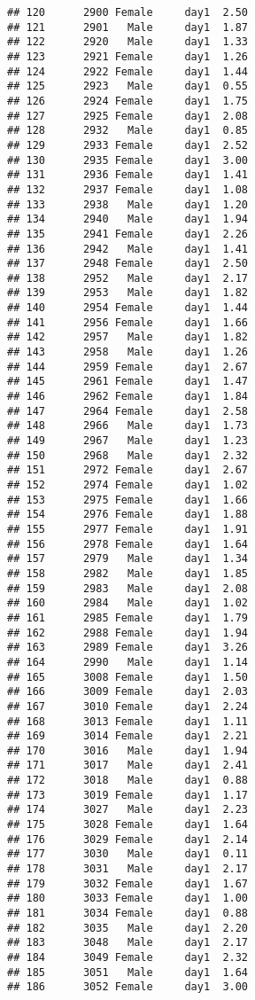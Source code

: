 \documentclass[
]{article}
\begin{document}
\begin{verbatim}
## 120      2900 Female     day1  2.50
## 121      2901   Male     day1  1.87
## 122      2920   Male     day1  1.33
## 123      2921 Female     day1  1.26
## 124      2922 Female     day1  1.44
## 125      2923   Male     day1  0.55
## 126      2924 Female     day1  1.75
## 127      2925 Female     day1  2.08
## 128      2932   Male     day1  0.85
## 129      2933 Female     day1  2.52
## 130      2935 Female     day1  3.00
## 131      2936 Female     day1  1.41
## 132      2937 Female     day1  1.08
## 133      2938   Male     day1  1.20
## 134      2940   Male     day1  1.94
## 135      2941 Female     day1  2.26
## 136      2942   Male     day1  1.41
## 137      2948 Female     day1  2.50
## 138      2952   Male     day1  2.17
## 139      2953   Male     day1  1.82
## 140      2954 Female     day1  1.44
## 141      2956 Female     day1  1.66
## 142      2957   Male     day1  1.82
## 143      2958   Male     day1  1.26
## 144      2959 Female     day1  2.67
## 145      2961 Female     day1  1.47
## 146      2962 Female     day1  1.84
## 147      2964 Female     day1  2.58
## 148      2966   Male     day1  1.73
## 149      2967   Male     day1  1.23
## 150      2968   Male     day1  2.32
## 151      2972 Female     day1  2.67
## 152      2974 Female     day1  1.02
## 153      2975 Female     day1  1.66
## 154      2976 Female     day1  1.88
## 155      2977 Female     day1  1.91
## 156      2978 Female     day1  1.64
## 157      2979   Male     day1  1.34
## 158      2982   Male     day1  1.85
## 159      2983   Male     day1  2.08
## 160      2984   Male     day1  1.02
## 161      2985 Female     day1  1.79
## 162      2988 Female     day1  1.94
## 163      2989 Female     day1  3.26
## 164      2990   Male     day1  1.14
## 165      3008 Female     day1  1.50
## 166      3009 Female     day1  2.03
## 167      3010 Female     day1  2.24
## 168      3013 Female     day1  1.11
## 169      3014 Female     day1  2.21
## 170      3016   Male     day1  1.94
## 171      3017   Male     day1  2.41
## 172      3018   Male     day1  0.88
## 173      3019 Female     day1  1.17
## 174      3027   Male     day1  2.23
## 175      3028 Female     day1  1.64
## 176      3029 Female     day1  2.14
## 177      3030   Male     day1  0.11
## 178      3031   Male     day1  2.17
## 179      3032 Female     day1  1.67
## 180      3033 Female     day1  1.00
## 181      3034 Female     day1  0.88
## 182      3035   Male     day1  2.20
## 183      3048   Male     day1  2.17
## 184      3049 Female     day1  2.32
## 185      3051   Male     day1  1.64
## 186      3052 Female     day1  3.00

\end{verbatim}
\end{document}
